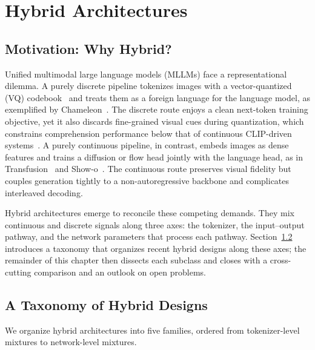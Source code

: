 
\section{Hybrid Architectures}
\label{sec:hybrid}

\subsection{Motivation: Why Hybrid?}
\label{subsec:hybrid-motivation}

Unified multimodal large language models (MLLMs) face a representational dilemma. A purely discrete pipeline tokenizes images with a vector-quantized (VQ) codebook~\cite{DBLP:conf/nips/OordVK17,DBLP:conf/cvpr/EsserRO21,yu2024magvitv2} and treats them as a foreign language for the language model, as exemplified by Chameleon~\cite{Team202409818}. The discrete route enjoys a clean next-token training objective, yet it also discards fine-grained visual cues during quantization, which constrains comprehension performance below that of continuous CLIP-driven systems~\cite{Lin202505422,DBLP:conf/cvpr/YangYZRZ0Z25}. A purely continuous pipeline, in contrast, embeds images as dense features and trains a diffusion or flow head jointly with the language head, as in Transfusion~\cite{Zhou202411039} and Show-o~\cite{Xie202412528}. The continuous route preserves visual fidelity but couples generation tightly to a non-autoregressive backbone and complicates interleaved decoding.

Hybrid architectures emerge to reconcile these competing demands. They mix continuous and discrete signals along three axes: the tokenizer, the input--output pathway, and the network parameters that process each pathway. Section~\ref{subsec:hybrid-taxonomy} introduces a taxonomy that organizes recent hybrid designs along these axes; the remainder of this chapter then dissects each subclass and closes with a cross-cutting comparison and an outlook on open problems.

\subsection{A Taxonomy of Hybrid Designs}
\label{subsec:hybrid-taxonomy}

We organize hybrid architectures into five families, ordered from tokenizer-level mixtures to network-level mixtures. 

